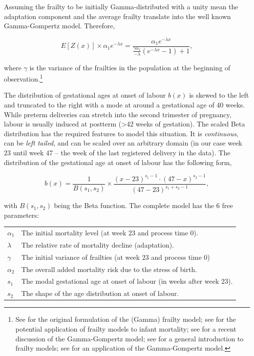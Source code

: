 \documentclass[
  12pt
]{scrartcl}
\begin{document}
Assuming the frailty to be initially Gamma-distributed with a unity mean the adaptation component and the average frailty translate into the well known Gamma-Gompertz model. Therefore,

$$
  E[Z(x)] \times \alpha_1 e^{-\lambda x} = \frac {\alpha_1 e^{-\lambda x}} {\frac{\gamma \alpha_1} {-\lambda} (e^{-\lambda x} - 1) + 1},
$$

where $\gamma$ is the variance of the frailties in the population at the beginning of observation.\footnote{See \cite{Vaupel1979} for the original formulation of the (Gamma) frailty model; see \cite{Vaupel1985} for the potential application of frailty models to infant mortality; see \cite{Vaupel2014} for a recent discussion of the Gamma-Gompertz model; see \cite{Wienke2011} for a general introduction to frailty models; see \cite{Wienke2003} for an application of the Gamma-Gompertz model.}

The distribution of gestational ages at onset of labour $b(x)$ is skewed to the left and truncated to the right with a mode at around a gestational age of 40 weeks. While preterm deliveries can stretch into the second trimester of pregnancy, labour is usually induced at postterm (>42 weeks of gestation). The scaled Beta distribution has the required features to model this situation. It is \emph{continuous}, can be \emph{left tailed}, and can be scaled over an arbitrary domain (in our case week 23 until week 47 -- the week of the last registered delivery in the data). The distribution of the gestational age at onset of labour has the following form,

$$
b(x) = \frac{1}{B(s_1,s_2)} \times \frac{(x-23)^{s_1-1}\cdot(47-x)^{s_2-1}} {(47-23)^{s_1+s_2-1}},
$$

with $B(s_1,s_2)$ being the Beta function. The complete model has the 6 free parameters:

\begin{tabular}{ll}
  $\alpha_1$ & The initial mortality level (at week 23 and process time 0). \\
  $\lambda$ & The relative rate of mortality decline (adaptation). \\
  $\gamma$ & The initial variance of frailties (at week 23 and process time 0) \\
  $\alpha_2$ & The overall added mortality risk due to the stress of birth. \\
  $s_1$ & The modal gestational age at onset of labour (in weeks after week 23). \\
  $s_2$ & The shape of the age distribution at onset of labour. \\
\end{tabular}
\end{document}
